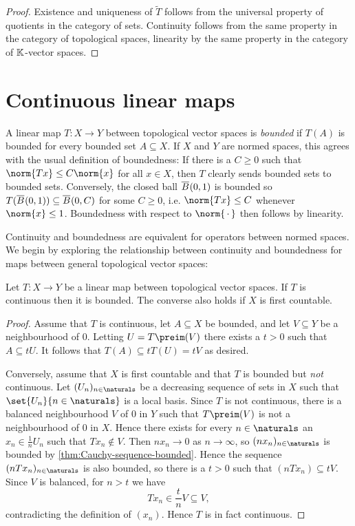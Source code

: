 \documentclass[article, a4paper, 11pt, oneside]{memoir}
\numberwithin{equation}{chapter}
\begin{document}
\begin{proof}
    Existence and uniqueness of $\tilde{T}$ follows from the universal property of quotients in the category of sets. Continuity follows from the same property in the category of topological spaces, linearity by the same property in the category of $\mathbb{K}$-vector spaces.
\end{proof}


\section{Continuous linear maps}

A linear map $T \colon X \to Y$ between topological vector spaces is \emph{bounded} if $T(A)$ is bounded for every bounded set $A \subseteq X$. If $X$ and $Y$ are normed spaces, this agrees with the usual definition of boundedness: If there is a $C \geq 0$ such that $\norm{Tx} \leq C\norm{x}$ for all $x \in X$, then $T$ clearly sends bounded sets to bounded sets. Conversely, the closed ball $\overline{B}_{}(0,1)$ is bounded so $T(\overline{B}_{}(0,1)) \subseteq \overline{B}_{}(0,C)$ for some $C \geq 0$, i.e. $\norm{Tx} \leq C$ whenever $\norm{x} \leq 1$. Boundedness with respect to $\norm{\,\cdot\,}$ then follows by linearity.

Continuity and boundedness are equivalent for operators between normed spaces. We begin by exploring the relationship between continuity and boundedness for maps between general topological vector spaces:

\begin{proposition}
    Let $T \colon X \to Y$ be a linear map between topological vector spaces. If $T$ is continuous then it is bounded. The converse also holds if $X$ is first countable.
\end{proposition}

\begin{proof}
    Assume that $T$ is continuous, let $A \subseteq X$ be bounded, and let $V \subseteq Y$ be a neighbourhood of $0$. Letting $U = T\preim(V)$ there exists a $t > 0$ such that $A \subseteq tU$. It follows that $T(A) \subseteq tT(U) = tV$ as desired.

    Conversely, assume that $X$ is first countable and that $T$ is bounded but \emph{not} continuous. Let $(U_n)_{n \in \naturals}$ be a decreasing sequence of sets in $X$ such that $\set{U_n}{n \in \naturals}$ is a local basis. Since $T$ is not continuous, there is a balanced neighbourhood $V$ of $0$ in $Y$ such that $T\preim(V)$ is not a neighbourhood of $0$ in $X$. Hence there exists for every $n \in \naturals$ an $x_n \in \frac{1}{n} U_n$ such that $Tx_n \not\in V$. Then $nx_n \to 0$ as $n \to \infty$, so $(nx_n)_{n \in \naturals}$ is bounded by \cref{thm:Cauchy-sequence-bounded}. Hence the sequence $(nTx_n)_{n \in \naturals}$ is also bounded, so there is a $t > 0$ such that $(nTx_n) \subseteq tV$. Since $V$ is balanced, for $n > t$ we have
    \begin{equation*}
        Tx_n
            \in \frac{t}{n} V
            \subseteq V,
    \end{equation*}
    contradicting the definition of $(x_n)$. Hence $T$ is in fact continuous.
\end{proof}
\end{document}
